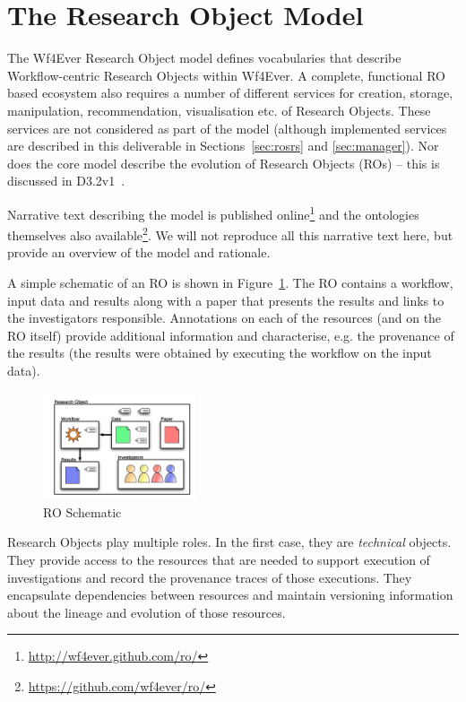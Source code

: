 \section{The Research Object Model}
\label{sec:model}

The Wf4Ever Research Object model defines vocabularies that describe Workflow-centric Research Objects within Wf4Ever. A complete, functional RO based ecosystem also requires a number of different services for creation, storage, manipulation, recommendation, visualisation etc. of Research Objects. These services are not considered as part of the model (although implemented services are described in this deliverable in Sections~\ref{sec:rosrs} and \ref{sec:manager}). Nor does the core model describe the evolution of Research Objects (ROs) -- this is discussed in D3.2v1~\cite{D3.2v1}.

Narrative text describing the model is published online\footnote{\url{http://wf4ever.github.com/ro/}} and the ontologies themselves also available\footnote{\url{https://github.com/wf4ever/ro/}}. We will not reproduce all this narrative text here, but provide an overview of the model and rationale.

A simple schematic of an RO is shown in Figure~\ref{fig:ro}. The RO contains a workflow, input data and results along with a paper that presents the results and links to the investigators responsible. Annotations on each of the resources (and on the RO itself) provide additional information and characterise, e.g. the provenance of the results (the results were obtained by executing the workflow on the input data). 

\begin{figure}[ht]
  \centering
  \includegraphics[width=0.4\textwidth]{Figures/RO-cartoon}
  \caption{RO Schematic}
  \label{fig:ro}
\end{figure}
 Research Objects play multiple roles. In the first case, they are \emph{technical} objects. They provide access to the resources that are needed to support execution of investigations and record the provenance traces of those executions. They encapsulate dependencies between resources and maintain versioning information about the lineage and evolution of those resources.

